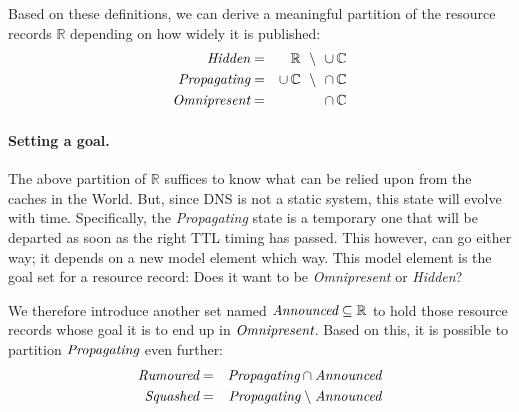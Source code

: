 \documentclass[twoside,english]{article}
\newcommand{\unionprefix}{\mathopen{\cup}\ensuremath{\,}}
\newcommand{\intersectionprefix}{\mathopen{\cap}\ensuremath{\,}}
\renewcommand{\setminus}{\mathrel{\backslash}}
\begin{document}
Based on these definitions, we can derive a meaningful partition of the
resource records $\mathbb{R}$ depending on how widely it is published:
%
\begin{eqnarray}\label{states}
	\emph{Hidden} &=& \mathbb{R}~\setminus~\unionprefix \mathbb{C} \\
	\emph{Propagating} &=& \unionprefix \mathbb{C}~\setminus~\intersectionprefix \mathbb{C} \\
	\emph{Omnipresent} &=& \intersectionprefix \mathbb{C}
\end{eqnarray}

\paragraph{Setting a goal.}
The above partition of $\mathbb{R}$ suffices to know what can be relied upon from the
caches in the World.  But, since DNS is not a static system, this state will evolve
with time.  Specifically, the \emph{Propagating} state is a temporary one that will be
departed as soon as the right TTL timing has passed.  This however, can go either
way; it depends on a new model element which way.  This model element is the goal
set for a resource record: Does it want to be \emph{Omnipresent} or \emph{Hidden}?

We therefore introduce another set named $\emph{Announced}\subseteq\mathbb{R}$ to hold
those resource records whose goal it is to end up in $\emph{Omnipresent}$.  Based on
this, it is possible to partition $\emph{Propagating}$ even further:
%
\begin{eqnarray}\label{states}
	\emph{Rumoured} &=& \emph{Propagating} \cap \emph{Announced}\\
	\emph{Squashed} &=& \emph{Propagating} \setminus \emph{Announced}
\end{eqnarray}
\end{document}
